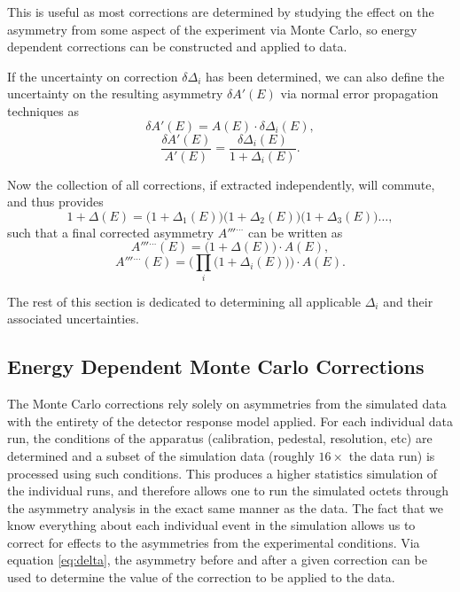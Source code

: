 This is useful as most corrections are determined by studying the effect on the asymmetry
from some aspect of the experiment via Monte Carlo, so energy dependent corrections can
be constructed and applied to data.

If the uncertainty on correction $\delta\Delta_i$ has been determined, we can also define
the uncertainty on the resulting asymmetry $\delta A'(E)$ via normal error propagation
techniques as
%
\begin{equation} 
  \delta A'(E) = A(E) \cdot \delta\Delta_i(E),
\end{equation}
%
\begin{equation} 
  \frac{\delta A'(E)}{A'(E)} =  \frac{ \delta\Delta_i(E)}{1+\Delta_i(E)}.
\end{equation}

Now the collection of all corrections, if extracted independently, will commute, and thus
provides
%
\begin{equation}
1+\Delta(E)=\big(1+\Delta_1(E)\big)\big(1+\Delta_2(E)\big)\big(1+\Delta_3(E)\big)\ldots,
\end{equation}
%
\noindent such that a final corrected asymmetry $A'''^{\ldots}$ can be written as 
%
\begin{equation*}
A'''^{\ldots}(E) = \big(1+\Delta(E)\big) \cdot A(E),
\end{equation*}
%
\begin{equation}
A'''^{\ldots}(E) = \Big(\prod_i\big(1+\Delta_i(E)\big)\Big)\cdot A(E).
\end{equation}

The rest of this section is dedicated to determining all applicable $\Delta_i$
and their associated uncertainties.

\subsection{Energy Dependent Monte Carlo Corrections}

The Monte Carlo corrections rely solely on asymmetries from the simulated data with
the entirety of the detector response model applied. For each individual data run, the
conditions of the apparatus (calibration, pedestal, resolution, etc) are determined
and a subset of the simulation data (roughly $16 \times $ the data run) is processed
using such conditions. This produces a higher statistics simulation of the individual runs,
and therefore allows one to run the simulated octets through the asymmetry analysis in
the exact same manner as the data. The fact that we know everything about each individual
event in the simulation allows us to correct for effects to the asymmetries from
the experimental conditions. Via equation \ref{eq:delta}, the asymmetry before and after
a given correction can be used to determine the value of the correction to be applied to the
data.

